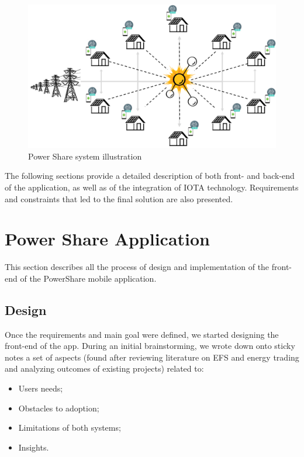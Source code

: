 \begin{figure}[h]
\centering
\includegraphics[width=1.0\textwidth]{./Images/ps}
\caption{Power Share system illustration}
\label{fig:ps}
\end{figure}


The following sections provide a detailed description of both front- and back-end of the application, as well as of the integration of IOTA technology. Requirements and constraints that led to the final solution are also presented. 

\section{Power Share Application}


This section describes all the process of design and implementation of the front-end of the PowerShare mobile application.



\subsection{Design}


Once the requirements and main goal  were defined, we started designing the front-end of the app.  During an initial brainstorming, we wrote down onto sticky notes a set of aspects (found after reviewing literature on \ac{EFS} and energy trading and analyzing outcomes of existing projects) related to:

\begin{itemize}
    \item Users needs;
    \item Obstacles to adoption;
    \item Limitations of both systems;
    \item Insights.
\end{itemize}


